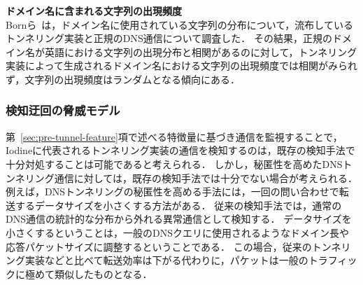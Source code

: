 \hspace{-12pt}\textbf{ドメイン名に含まれる文字列の出現頻度}\\
\hspace{12pt}Bornら~\cite{born}は，ドメイン名に使用されている文字列の分布について，流布しているトンネリング実装と正規のDNS通信について調査した．
その結果，正規のドメイン名が英語における文字列の出現分布と相関があるのに対して，トンネリング実装によって生成されるドメイン名における文字列の出現頻度では相関がみられず，文字列の出現頻度はランダムとなる傾向にある．



\subsubsection{検知迂回の脅威モデル}
\label{sec:bypass-method}
第~\ref{sec:pre-tunnel-feature}項で述べる特徴量に基づき通信を監視することで，Iodineに代表されるトンネリング実装の通信を検知するのは，既存の検知手法で十分対処することは可能であると考えられる．
しかし，秘匿性を高めたDNSトンネリング通信に対しては，既存の検知手法では十分でない場合が考えられる．
例えば，DNSトンネリングの秘匿性を高める手法には，一回の問い合わせで転送するデータサイズを小さくする方法がある．
従来の検知手法では，通常のDNS通信の統計的な分布から外れる異常通信として検知する．
データサイズを小さくするということは，一般のDNSクエリに使用されるようなドメイン長や応答パケットサイズに調整するということである．
この場合，従来のトンネリング実装などと比べて転送効率は下がる代わりに，パケットは一般のトラフィックに極めて類似したものとなる．

